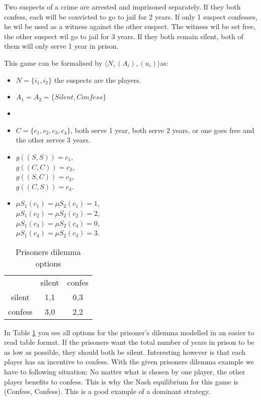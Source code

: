 Two suspects of a crime are arrested and imprisoned separately. If they both confess, each will be convicted to go to jail for 2 years. If only 1 suspect confesses, he wil be used as a witness against the other suspect. The witness wil be set free, the other suspect wil go to jail for 3 years. If they both remain silent, both of them will only serve 1 year in prison.

This game can be formalised by $\langle N, (A_i), (u_i) \rangle$as:
\begin{itemize}
	\item $N = \{i_{1}, i_{2} \}$ the suspects are the players.
    \item $A_1 = A_2 = \{Silent, Confess\}$

	\item {}

    \item $C = \{c_{1},c_{2},c_{3},c_{4}\}$, both serve 1 year, both serve 2 years, or one goes free and the other serves 3 years.
    \item $g((S,S)) = c_{1}$, \\
    $g((C,C)) = c_{2}$, \\
    $g((S,C)) = c_{3}$, \\
    $g((C,S)) = c_{4}$.
    \item $\mu S_{1}(c_{1}) = \mu S_{2}(c_{1}) = 1$, \\
    $\mu S_{1}(c_{2}) = \mu S_{2}(c_{2}) = 2$, \\
    $\mu S_{1}(c_{3}) = \mu S_{2}(c_{4}) = 0$, \\
    $\mu S_{1}(c_{4}) = \mu S_{2}(c_{3}) = 3$.
\end{itemize}

\begin{table}[h]
\centering
\begin{tabular}{ccc}
                             & silent                   & confes                   \\ \cline{2-3} 
\multicolumn{1}{c|}{silent}  & \multicolumn{1}{c|}{1,1} & \multicolumn{1}{c|}{0,3} \\ \cline{2-3} 
\multicolumn{1}{c|}{confess} & \multicolumn{1}{c|}{3,0} & \multicolumn{1}{c|}{2,2} \\ \cline{2-3} 
\end{tabular}
\caption{Prisoners dilemma options}
\label{prisoners-d}
\end{table}

In Table \ref{prisoners-d} you see all options for the prisoner's dilemma modelled in an easier to read table format. If the prisoners want the total number of years in prison to be as low as possible, they should both be silent. Interesting however is that each player has an incentive to confess. With the given prisoners dilemma example we have to following situation: No matter what is chosen by one player, the other player benefits to confess. This is why the Nash equilibrium for this game is (Confess, Confess). This is a good example of a dominant strategy. 

